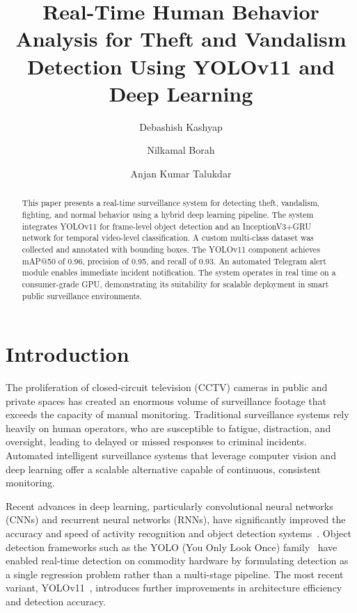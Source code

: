 \documentclass[runningheads]{llncs}
\begin{document}
\title{Real-Time Human Behavior Analysis for Theft and Vandalism Detection Using YOLOv11 and Deep Learning}

\author{
Debashish Kashyap \and
Nilkamal Borah \and
Anjan Kumar Talukdar
}



\maketitle

\begin{abstract}
This paper presents a real-time surveillance system for detecting theft, vandalism, fighting, and normal behavior using a hybrid deep learning pipeline. The system integrates YOLOv11 for frame-level object detection and an InceptionV3+GRU network for temporal video-level classification. A custom multi-class dataset was collected and annotated with bounding boxes. The YOLOv11 component achieves mAP@50 of 0.96, precision of 0.95, and recall of 0.93. An automated Telegram alert module enables immediate incident notification. The system operates in real time on a consumer-grade GPU, demonstrating its suitability for scalable deployment in smart public surveillance environments.

\end{abstract}

\section{Introduction}

The proliferation of closed-circuit television (CCTV) cameras in public and private spaces has created an enormous volume of surveillance footage that exceeds the capacity of manual monitoring. Traditional surveillance systems rely heavily on human operators, who are susceptible to fatigue, distraction, and oversight, leading to delayed or missed responses to criminal incidents. Automated intelligent surveillance systems that leverage computer vision and deep learning offer a scalable alternative capable of continuous, consistent monitoring.

Recent advances in deep learning, particularly convolutional neural networks (CNNs) and recurrent neural networks (RNNs), have significantly improved the accuracy and speed of activity recognition and object detection systems~\cite{he2016,simonyan2015}. Object detection frameworks such as the YOLO (You Only Look Once) family~\cite{redmon2016,jocher2023} have enabled real-time detection on commodity hardware by formulating detection as a single regression problem rather than a multi-stage pipeline. The most recent variant, YOLOv11~\cite{khanam2024}, introduces further improvements in architecture efficiency and detection accuracy.
\end{document}
